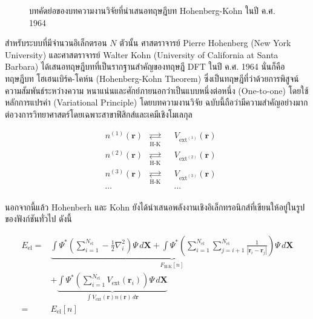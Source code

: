 \begin{figure}[H]
    \centering
    \caption{บทคัดย่อของบทความงานวิจัยที่นำเสนอทฤษฎีบท Hohenberg-Kohn ในปี ค.ศ. 1964}
    \label{fig:hohenberg_kohn_abs}
\end{figure}

สำหรับระบบที่มีจำนวนอิเล็กตรอน $N$ ตัวนั้น ศาสตราจารย์ Pierre Hohenberg (New York University) และศาสตราจารย์ Walter Kohn 
(University of California at Santa Barbara) ได้เสนอทฤษฎีบทที่เป็นรากฐานสำคัญของทฤษฎี DFT ในปี ค.ศ. 1964 นั่นก็คือทฤษฎีบท%
โฮเฮนเบิร์ค-โคห์น (Hohenberg-Kohn Theorem)\autocite{hohenberg1964} ซึ่งเป็นทฤษฎีที่ว่าด้วยการพิสูจน์ความสัมพันธ์ระหว่างความ%
หนาแน่นและศักย์ภายนอกว่าเป็นแบบหนึ่งต่อหนึ่ง (One-to-one) โดยใช้หลักการแปรค่า (Variational Principle) โดยบทความงานวิจัย%
ฉบับนี้ถือว่ามีความสำคัญอย่างมากต่อวงการวิทยาศาสตร์โดยเฉพาะสาขาฟิสิกส์และเคมีเชิงโมเลกุล

\begin{framed}
    \centering
    \begin{align*}
        &n^{(1)}(\bm{r}) &\underset{\text{H-K}}{\rightleftarrows} &&V_{\text{ext}^{(1)}}(\bm{r}) \\[0.5ex]
        &n^{(2)}(\bm{r}) &\underset{\text{H-K}}{\rightleftarrows} &&V_{\text{ext}^{(2)}}(\bm{r}) \\[0.5ex]
        &n^{(3)}(\bm{r}) &\underset{\text{H-K}}{\rightleftarrows} &&V_{\text{ext}^{(3)}}(\bm{r}) \\[0.5ex]
        &\cdots & &&\cdots 
    \end{align*}
\end{framed}

นอกจากนี้แล้ว Hohenberh และ Kohn ยังได้นำเสนอพลังงานเชิงอิเล็กทรอนิกส์ที่เขียนให้อยู่ในรูปของฟังก์ชันทั่วไป ดังนี้

\begin{align}\label{eq:ener_univer_ext_pot}
    E_{\text{el}} =& \underbrace{\int \Psi^{\ast} 
    \left ( \sum^{N_{\text{el}}}_{i=1} -\frac{1}{2} \nabla^{2}_{i} \right ) 
    \Psi \, d\bm{X} 
    + \int \Psi^{\ast} 
    \left ( \sum^{N_{\text{el}}}_{i=1} \sum^{N_{\text{el}}}_{j=i+1} \frac{1}{|\bm{r}_{i}-\bm{r}_{j}|} \right ) 
    \Psi \, d\bm{X}}_{\textstyle F_{\text{H-K}}[n]} \nonumber \\
    &+ \underbrace{\int \Psi^{\ast}  
    \left ( \sum^{N_{\text{el}}}_{i=1} V_{\text{ext}}(\bm{r}_{i}) \right ) 
    \Psi \, d\bm{X}%
    }_{\textstyle \int V_{\text{ext}}(\bm{r}) n(\bm{r}) \, d\bm{r}} \\
    =& E_{\text{el}}[n]
\end{align}

